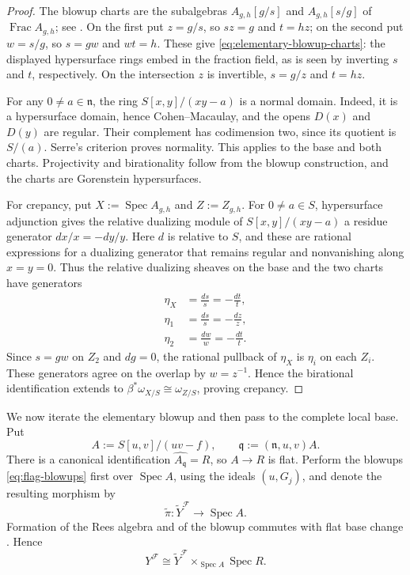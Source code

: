 \documentclass[a4paper,reqno]{amsart}
\def\F{\mathcal{F}}
\def\n{\mathfrak{n}}
\DeclareMathOperator{\Frac}{Frac}
\DeclareMathOperator{\Spec}{Spec}
\theoremstyle{definition}
\begin{document}
\begin{proof}
The blowup charts are the subalgebras $A_{g,h}[g/s]$ and $A_{g,h}[s/g]$ of $\Frac A_{g,h}$; see \cite[Tag 0804]{stacks-project}. On the first put $z=g/s$, so $sz=g$ and $t=hz$; on the second put $w=s/g$, so $s=gw$ and $wt=h$. These give \eqref{eq:elementary-blowup-charts}: the displayed hypersurface rings embed in the fraction field, as is seen by inverting $s$ and $t$, respectively. On the intersection $z$ is invertible, $s=g/z$ and $t=hz$.

For any $0\ne a\in\n$, the ring $S[x,y]/(xy-a)$ is a normal domain. Indeed, it is a hypersurface domain, hence Cohen--Macaulay, and the opens $D(x)$ and $D(y)$ are regular. Their complement has codimension two, since its quotient is $S/(a)$. Serre's criterion proves normality. This applies to the base and both charts. Projectivity and birationality follow from the blowup construction, and the charts are Gorenstein hypersurfaces.

For crepancy, put $X:=\Spec A_{g,h}$ and $Z:=Z_{g,h}$. For $0\ne a\in S$, hypersurface adjunction \cite[Tag 0AA4]{stacks-project} gives the relative dualizing module of $S[x,y]/(xy-a)$ a residue generator $dx/x=-dy/y$. Here $d$ is relative to $S$, and these are rational expressions for a dualizing generator that remains regular and nonvanishing along $x=y=0$. Thus the relative dualizing sheaves on the base and the two charts have generators
\[
\begin{aligned}
\eta_X&=\frac{ds}{s}=-\frac{dt}{t},\\
\eta_1&=\frac{ds}{s}=-\frac{dz}{z},\\
\eta_2&=\frac{dw}{w}=-\frac{dt}{t}.
\end{aligned}
\]
Since $s=gw$ on $Z_2$ and $dg=0$, the rational pullback of $\eta_X$ is $\eta_i$ on each $Z_i$. These generators agree on the overlap by $w=z^{-1}$. Hence the birational identification extends to $\beta^*\omega_{X/S}\cong\omega_{Z/S}$, proving crepancy.
\end{proof}

We now iterate the elementary blowup and then pass to the complete local base. Put
\[
A:=S[u,v]/(uv-f),\qquad \mathfrak q:=(\n,u,v)A.
\]
There is a canonical identification $\widehat{A_{\mathfrak q}}=R$, so $A\to R$ is flat. Perform the blowups \eqref{eq:flag-blowups} first over $\Spec A$, using the ideals $(u,G_j)$, and denote the resulting morphism by
\[
\widetilde\pi\colon\widetilde Y^\F\longrightarrow\Spec A.
\]
Formation of the Rees algebra and of the blowup commutes with flat base change \cite[Tag 0805]{stacks-project}. Hence
\begin{equation}\label{eq:flag-flat-base-change}
Y^\F\cong\widetilde Y^\F\times_{\Spec A}\Spec R.
\end{equation}
\end{document}
